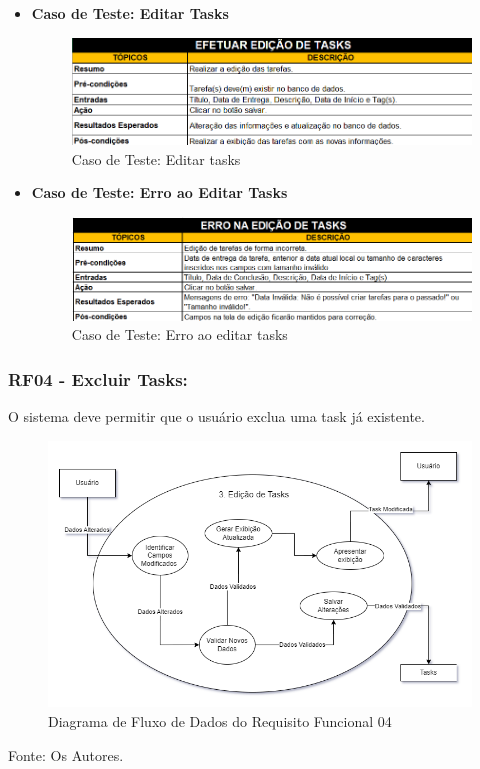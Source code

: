 \documentclass[a4paper,12pt]{article}
\begin{document}
\begin{itemize}
	\item\textbf{Caso de Teste: Editar Tasks}
	\begin{figure}
		\centering
		\includegraphics[scale=0.75]{UnitTest/trueCase/editTask.png}
		\caption{Caso de Teste: Editar tasks}
	\end{figure}
	\item\textbf{Caso de Teste: Erro ao Editar Tasks}
	\begin{figure}
		\centering
		\includegraphics[scale=0.75]{UnitTest/falseCase/editTask.png}
		\caption{Caso de Teste: Erro ao editar tasks}
	\end{figure}
\end{itemize}

\pagebreak
\subsubsection{RF04 - Excluir Tasks:}
O sistema deve permitir que o usuário exclua uma task já existente.
\begin{figure}[H]
	\centering
	\includegraphics[scale=0.45]{DFDs/RF03.drawio.png}
	\caption{Diagrama de Fluxo de Dados do Requisito Funcional 04}
\end{figure}
\noindent Fonte: Os Autores.
\end{document}
